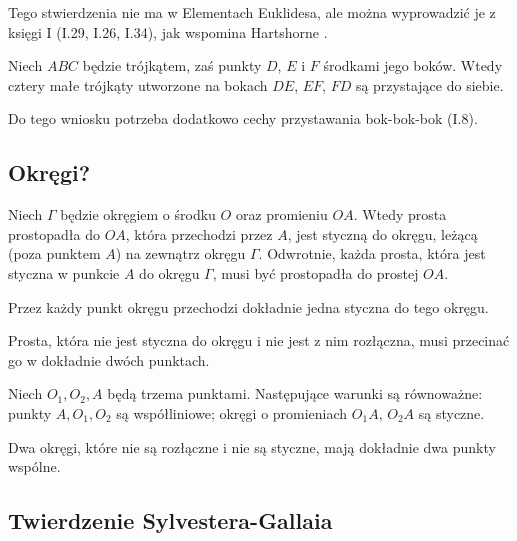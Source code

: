 Tego stwierdzenia nie ma w Elementach Euklidesa, ale można wyprowadzić je z księgi I (I.29, I.26, I.34), jak wspomina Hartshorne \cite[s. 45, 52. 53]{hartshorne2000}.

\begin{corollary}
	Niech $ABC$ będzie trójkątem, zaś punkty $D$, $E$ i $F$ środkami jego boków.
	Wtedy cztery małe trójkąty utworzone na bokach $DE$, $EF$, $FD$ są przystające do siebie.
\end{corollary}

Do tego wniosku potrzeba dodatkowo cechy przystawania bok-bok-bok (I.8).
%

\subsection{Okręgi?}
\begin{proposition}
    Niech $\Gamma$ będzie okręgiem o środku $O$ oraz promieniu $OA$.
    Wtedy prosta prostopadła do $OA$, która przechodzi przez $A$, jest styczną do okręgu, leżącą (poza punktem $A$) na zewnątrz okręgu $\Gamma$.
    Odwrotnie, każda prosta, która jest styczna w punkcie $A$ do okręgu $\Gamma$, musi być prostopadła do prostej $OA$.
\end{proposition} %

\begin{corollary}
    Przez każdy punkt okręgu przechodzi dokładnie jedna styczna do tego okręgu.
\end{corollary} %

\begin{corollary}
    Prosta, która nie jest styczna do okręgu i nie jest z nim rozłączna, musi przecinać go w dokładnie dwóch punktach.
\end{corollary} %

\begin{proposition}
    Niech $O_1, O_2, A$ będą trzema punktami.
    Następujące warunki są równoważne: punkty $A, O_1, O_2$ są współliniowe; okręgi o promieniach $O_1A$, $O_2A$ są styczne.
\end{proposition} %

\begin{corollary}
    Dwa okręgi, które nie są rozłączne i nie są styczne, mają dokładnie dwa punkty wspólne.
\end{corollary} %

%
\subsection{Twierdzenie Sylvestera-Gallaia}

%

%
